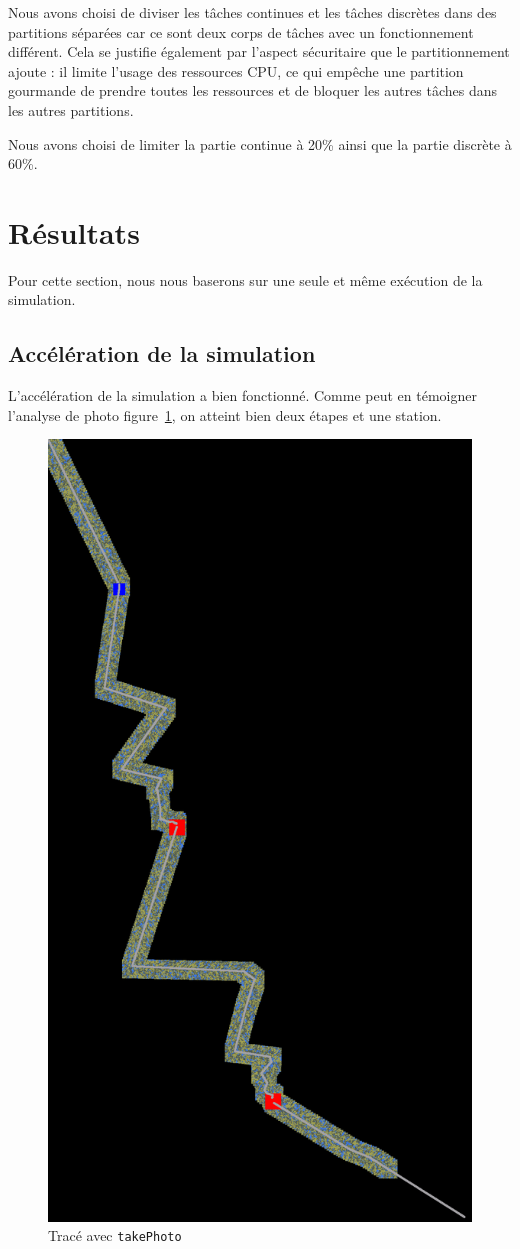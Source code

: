 \documentclass[conference]{IEEEtran}
\begin{document}
Nous avons choisi de diviser les tâches continues et les tâches discrètes dans des
partitions séparées car ce sont deux corps de tâches avec un fonctionnement différent.
Cela se justifie également par l'aspect sécuritaire que le partitionnement ajoute : il
limite l'usage des ressources CPU, ce qui empêche une partition gourmande de prendre
toutes les ressources et de bloquer les autres tâches dans les autres partitions.

Nous avons choisi de limiter la partie continue à 20\% ainsi que la partie discrète à
60\%.



\section{Résultats}
\label{sec:resultats}

Pour cette section, nous nous baserons sur une seule et même exécution de la simulation.

\subsection{Accélération de la simulation}

L'accélération de la simulation a bien fonctionné. Comme peut en témoigner l'analyse de
photo figure~\ref{fig:path_image}, on atteint bien deux étapes et une station.

\begin{figure}
    \centering
    \includegraphics[height=0.7\linewidth]{map.png}
    \caption{Tracé avec \texttt{takePhoto}}
    \label{fig:path_image}
\end{figure}
\end{document}
